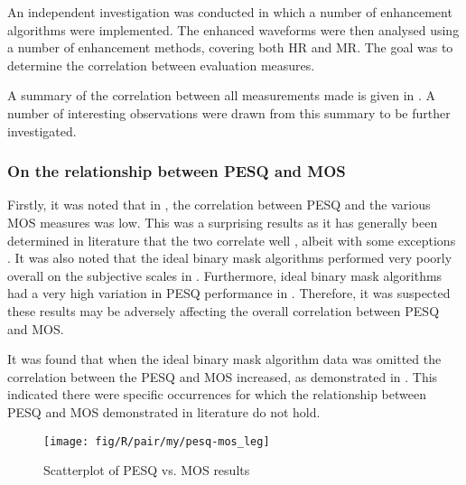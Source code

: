 An independent investigation was conducted in which a number of enhancement
algorithms were implemented. The enhanced waveforms were then analysed
using a number of enhancement methods, covering both \ac{HR} and
\ac{MR}. The goal was to determine the correlation between evaluation
measures.

A summary of the correlation between all measurements made is given
in . A number of interesting observations were drawn
from this summary to be further investigated.


\subsubsection*{On the relationship between \acs{PESQ} and \acs{MOS}}

Firstly, it was noted that in , the correlation between
\ac{PESQ} and the various \ac{MOS} measures was low. This was a
surprising results as it has generally been determined in literature
that the two correlate well \cite{Kitawaki2007,Rix2003,Rix2001},
albeit with some exceptions \cite{Liu2006}. It was also noted that
the ideal binary mask algorithms performed very poorly overall on
the subjective scales in .
Furthermore, ideal binary mask algorithms had a very high variation
in \ac{PESQ} performance in . Therefore, it was
suspected these results may be adversely affecting the overall correlation
between \ac{PESQ} and \ac{MOS}.

It was found that when the ideal binary mask algorithm data was omitted
the correlation between the \ac{PESQ} and \ac{MOS} increased, as
demonstrated in . This indicated there were specific
occurrences for which the relationship between \ac{PESQ} and \ac{MOS}
demonstrated in literature do not hold. 

\begin{figure}[h]

\texttt{[image: fig/R/pair/my/pesq-mos\_leg]}

\protect\caption{\label{fig:my-pesq-mos}Scatterplot of \acs{PESQ} vs. \acs{MOS}
results}
\end{figure}



